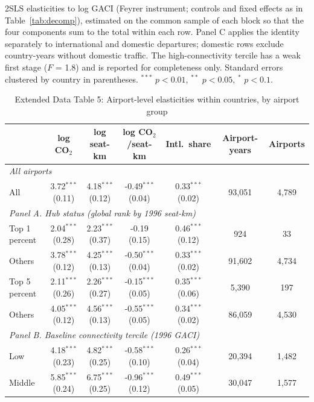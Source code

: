\documentclass[12pt]{article}
\begin{document}
\begin{table}[htbp]
\begin{threeparttable}
\begin{tablenotes}
\item 2SLS elasticities to log GACI (Feyrer instrument; controls and fixed effects as in Table~\ref{tab:decomp}), estimated on the common sample of each block so that the four components sum to the total within each row. Panel C applies the identity separately to international and domestic departures; domestic rows exclude country-years without domestic traffic. The high-connectivity tercile has a weak first stage ($F$ = 1.8) and is reported for completeness only. Standard errors clustered by country in parentheses. $^{***}$ $p<0.01$, $^{**}$ $p<0.05$, $^{*}$ $p<0.1$.
\end{tablenotes}
\end{threeparttable}
\end{table}

\begin{table}[htbp]
\centering
\begin{threeparttable}
\caption{Extended Data Table 5: Airport-level elasticities within countries, by airport group}
\label{tab:airport_het}
\scriptsize
\begin{tabular}{lcccccc}
\toprule
 & log CO$_2$ & log seat-km & log CO$_2$/seat-km & Intl.\ share & Airport-years & Airports \\
\midrule
\multicolumn{7}{l}{\textit{All airports}} \\
  All & 3.72$^{***}$ (0.11) & 4.18$^{***}$ (0.12) & -0.49$^{***}$ (0.04) & 0.33$^{***}$ (0.02) & 93,051 & 4,789 \\
\multicolumn{7}{l}{\textit{Panel A. Hub status (global rank by 1996 seat-km)}} \\
  Top 1 percent & 2.04$^{***}$ (0.28) & 2.23$^{***}$ (0.37) & -0.19 (0.15) & 0.46$^{***}$ (0.12) & 924 & 33 \\
  Others & 3.78$^{***}$ (0.12) & 4.25$^{***}$ (0.13) & -0.50$^{***}$ (0.04) & 0.33$^{***}$ (0.02) & 91,602 & 4,734 \\
  Top 5 percent & 2.11$^{***}$ (0.26) & 2.26$^{***}$ (0.27) & -0.15$^{***}$ (0.05) & 0.35$^{***}$ (0.06) & 5,390 & 197 \\
  Others & 4.05$^{***}$ (0.12) & 4.56$^{***}$ (0.13) & -0.55$^{***}$ (0.05) & 0.34$^{***}$ (0.02) & 86,059 & 4,530 \\
\multicolumn{7}{l}{\textit{Panel B. Baseline connectivity tercile (1996 GACI)}} \\
  Low & 4.18$^{***}$ (0.23) & 4.82$^{***}$ (0.25) & -0.58$^{***}$ (0.10) & 0.26$^{***}$ (0.04) & 20,394 & 1,482 \\
  Middle & 5.85$^{***}$ (0.24) & 6.75$^{***}$ (0.25) & -0.96$^{***}$ (0.12) & 0.49$^{***}$ (0.05) & 30,047 & 1,577 \\

\end{tabular}
\end{threeparttable}
\end{table}
\end{document}
